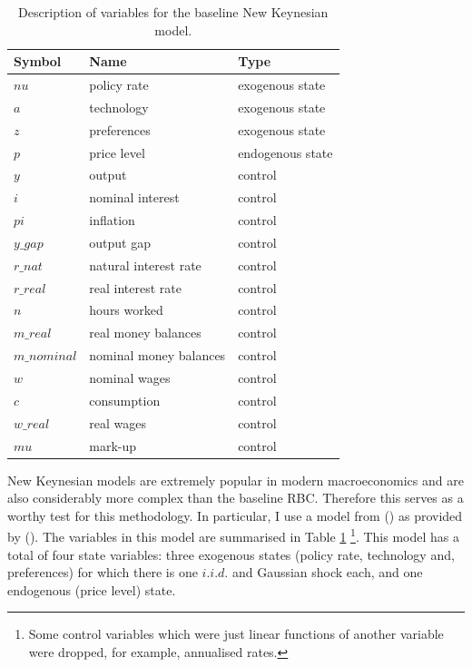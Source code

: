 \documentclass{article}
\begin{document}
\begin{table}
  \centering
  \begin{tabular}{|l|l|l|}
    \hline
    Symbol & Name & Type \\
    \hline
    $nu$ & policy rate & exogenous state \\
    $a$ & technology & exogenous state \\
    $z$ & preferences & exogenous state \\
    $p$ & price level & endogenous state \\
    $y$ & output & control \\
    $i$ & nominal interest & control \\
    $pi$ & inflation & control \\
    $y\_gap$ & output gap & control \\
    $r\_nat$ & natural interest rate & control \\
    $r\_real$ & real interest rate & control \\
    $n$ & hours worked & control \\
    $m\_real$ & real money balances & control \\
    $m\_nominal$ & nominal money balances & control \\
    $w$ & nominal wages & control \\ 
    $c$ & consumption & control \\
    $w\_real$ & real wages & control \\
    $mu$ & mark-up & control \\ \cline{2-2}
    \hline
  \end{tabular}
  \caption{Description of variables for the baseline New Keynesian model.}
  \label{nk_data}
\end{table}

New Keynesian models are extremely popular in modern macroeconomics and are also considerably more complex than the baseline RBC. Therefore this serves as a worthy test for this methodology. In particular, I use a model from \citeauthor{gali2015monetary} (\citeyear{gali2015monetary}) as provided by \citeauthor{pfeifer2020} (\citeyear{pfeifer2020}). The variables in this model are summarised in Table \ref{nk_data}  \footnote{Some control variables which were just linear functions of another variable were dropped, for example, annualised rates.}. This model has a total of four state variables: three exogenous states (policy rate, technology and, preferences) for which there is one $i.i.d.$ and Gaussian shock each, and one endogenous (price level) state.
\end{document}
